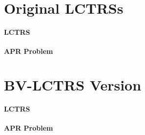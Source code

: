\documentclass[a4paper]{article}
\begin{document}

\section*{Original LCTRSs}

\paragraph{LCTRS}



\paragraph{APR Problem}



\newpage
\section*{BV-LCTRS Version}


\paragraph{LCTRS}



\paragraph{APR Problem}
\end{document}
